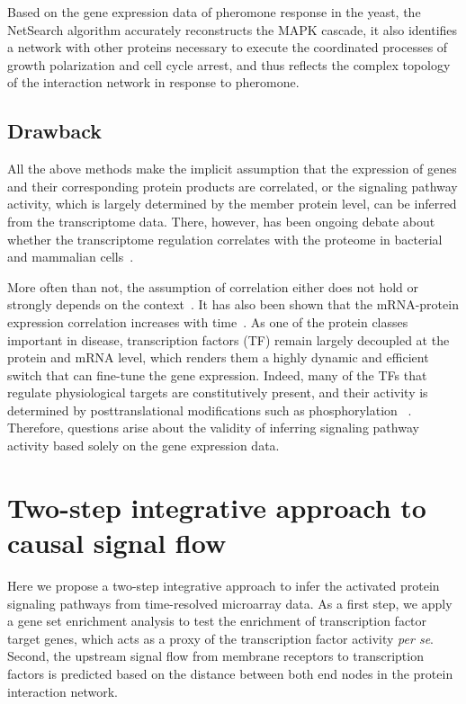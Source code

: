 Based on the gene expression data of pheromone response in the yeast, the 
NetSearch algorithm accurately reconstructs the MAPK cascade, it also identifies a 
network with other proteins necessary to execute the coordinated processes of 
growth polarization and cell cycle arrest, and thus 
reflects the complex topology of 
the interaction network in response to pheromone.

\subsection{Drawback}
All the above methods make the implicit assumption that the expression of genes
and their corresponding protein products are correlated, or the signaling 
pathway activity, which is largely determined by the member protein level, 
can be inferred from the transcriptome data. There, however, 
has been ongoing debate 
about whether the transcriptome regulation correlates with the proteome
in bacterial and mammalian cells~\citep{Taniguchi2010,Ghazalpour2011}. 

More
often than not, the assumption of correlation either does not hold or strongly depends on the context~\citep{Soufi2009}. 
It has also been shown that the mRNA-protein expression correlation increases 
with time~\citep{Fournier2010}.
As one of the protein classes important in disease, 
transcription factors (TF) remain largely decoupled at the 
protein
and mRNA level, which renders them a highly dynamic and efficient switch that 
can fine-tune the gene expression. Indeed, many of the TFs that regulate physiological
    targets are constitutively present, and their activity is determined
    by posttranslational modifications such as phosphorylation%
    ~\citep{Messina2004}.
Therefore, questions arise about the validity of inferring signaling 
pathway activity based solely on the gene expression data.

\section{Two-step integrative approach to causal signal flow}
Here we propose a two-step integrative approach to infer the activated protein signaling
pathways from time-resolved microarray data. As a first step, we apply a
gene set enrichment analysis to test the
enrichment of transcription factor target genes, which acts as a proxy of
the transcription factor activity \emph{per se}. Second, the upstream 
signal flow from membrane receptors to transcription factors is predicted 
based on the distance between both end nodes in the protein interaction
network.

